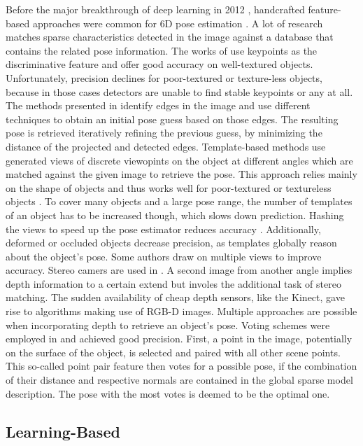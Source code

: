 Before the major breakthrough of deep learning in 2012 \cite{alexnet}, handcrafted feature-based approaches were common for 6D pose estimation \cite{ylecun}. A lot of research matches sparse characteristics detected in the image against a database that contains the related pose information. The works of \cite{dglowe1, dwagner} use keypoints as the discriminative feature and offer good accuracy on well-textured objects. Unfortunately, precision declines for poor-textured or texture-less objects, because in those cases detectors are unable to find stable keypoints or any at all. The methods presented in \cite{gklein,dglowe2,charris} identify edges in the image and use different techniques to obtain an initial pose guess based on those edges. The resulting pose is retrieved iteratively refining the previous guess, by minimizing the distance of the projected and detected edges.
\nnewline
Template-based methods \cite{hinterstoisser1, hinterstoisser2, rioscabrera, csteger} use generated views of discrete viewopints on the object at different angles which are matched against the given image to retrieve the pose. This approach relies mainly on the shape of objects and thus works well for poor-textured or textureless objects \cite{pertsch}. To cover many objects and a large pose range, the number of templates of an object has to be increased though, which slows down prediction. Hashing the views to speed up the pose estimator reduces accuracy \cite{zhou}. Additionally, deformed or occluded objects decrease precision, as templates globally reason about the object's pose.
\nnewline
Some authors draw on multiple views to improve accuracy. Stereo camers are used in \cite{kpauwels}. A second image from another angle implies depth information to a certain extend but involes the additional task of stereo matching. The sudden availability of cheap depth sensors, like the Kinect, gave rise to algorithms making use of RGB-D images. Multiple approaches are possible when incorporating depth to retrieve an object's pose. Voting schemes were employed in \cite{bdrost, salasmoreno} and achieved good precision. First, a point in the image, potentially on the surface of the object, is selected and paired with all other scene points. This so-called point pair feature then votes for a possible pose, if the combination of their distance and respective normals are contained in the global sparse model description. The pose with the most votes is deemed to be the optimal one.

\subsection{Learning-Based}


